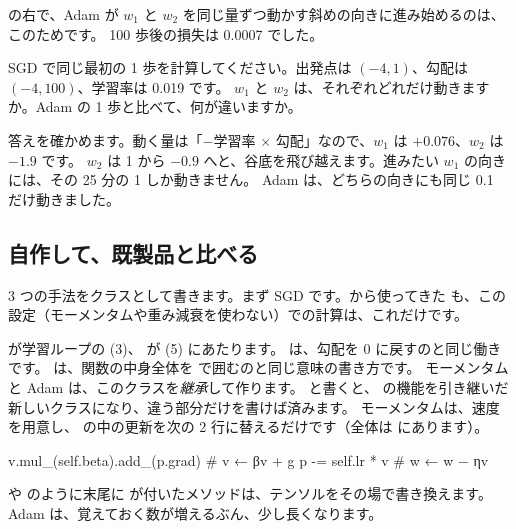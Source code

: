 の右で、Adam が $w_1$ と $w_2$ を同じ量ずつ動かす斜めの向きに進み始めるのは、このためです。
100 歩後の損失は 0.0007 でした。

\begin{quiz}
SGD で同じ最初の 1 歩を計算してください。出発点は $(-4, 1)$、勾配は $(-4, 100)$、学習率は 0.019 です。
$w_1$ と $w_2$ は、それぞれどれだけ動きますか。Adam の 1 歩と比べて、何が違いますか。
\end{quiz}

答えを確かめます。動く量は「$-$学習率 $\times$ 勾配」なので、$w_1$ は $+0.076$、$w_2$ は $-1.9$ です。
$w_2$ は 1 から $-0.9$ へと、谷底を飛び越えます。進みたい $w_1$ の向きには、その 25 分の 1 しか動きません。
Adam は、どちらの向きにも同じ 0.1 だけ動きました。

\subsection*{自作して、既製品と比べる}

3 つの手法をクラスとして書きます。まず SGD です。から使ってきた  も、この設定（モーメンタムや重み減衰を使わない）での計算は、これだけです。


 が学習ループの (3)、 が (5) にあたります。 は、勾配を 0 に戻すのと同じ働きです。
 は、関数の中身全体を  で囲むのと同じ意味の書き方です。
モーメンタムと Adam は、このクラスを\emph{継承}して作ります。
 と書くと、 の機能を引き継いだ新しいクラスになり、違う部分だけを書けば済みます。
モーメンタムは、速度  を用意し、 の中の更新を次の 2 行に替えるだけです（全体は  にあります）。
\begin{pycode}
v.mul_(self.beta).add_(p.grad)   # v ← βv + g
p -= self.lr * v                 # w ← w − ηv
\end{pycode}
 や  のように末尾に \code{_} が付いたメソッドは、テンソルをその場で書き換えます。
Adam は、覚えておく数が増えるぶん、少し長くなります。


